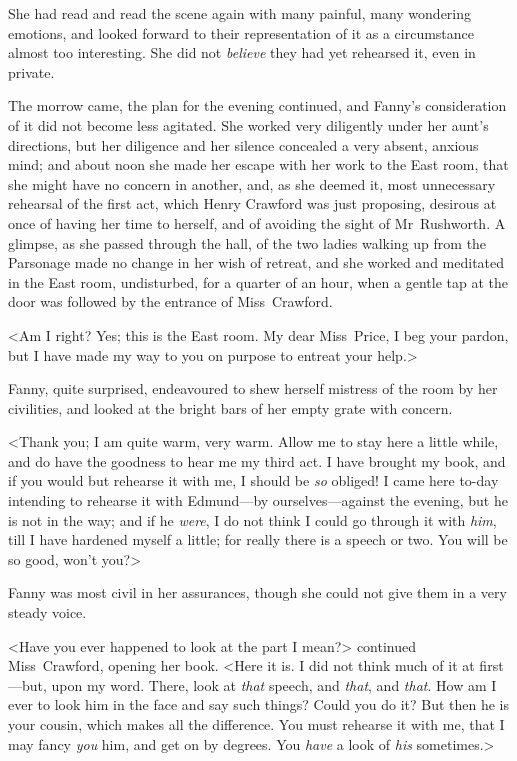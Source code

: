She had read and read the scene again with many painful, many wondering emotions, and looked forward to their representation of it as a circumstance almost too interesting. She did not \textit{believe}  they had yet rehearsed it, even in private.

The morrow came, the plan for the evening continued, and Fanny's consideration of it did not become less agitated. She worked very diligently under her aunt's directions, but her diligence and her silence concealed a very absent, anxious mind; and about noon she made her escape with her work to the East room, that she might have no concern in another, and, as she deemed it, most unnecessary rehearsal of the first act, which Henry Crawford was just proposing, desirous at once of having her time to herself, and of avoiding the sight of Mr~Rushworth. A glimpse, as she passed through the hall, of the two ladies walking up from the Parsonage made no change in her wish of retreat, and she worked and meditated in the East room, undisturbed, for a quarter of an hour, when a gentle tap at the door was followed by the entrance of Miss~Crawford.

<Am I right? Yes; this is the East room. My dear Miss~Price, I beg your pardon, but I have made my way to you on purpose to entreat your help.>

Fanny, quite surprised, endeavoured to shew herself mistress of the room by her civilities, and looked at the bright bars of her empty grate with concern.

<Thank you; I am quite warm, very warm. Allow me to stay here a little while, and do have the goodness to hear me my third act. I have brought my book, and if you would but rehearse it with me, I should be \textit{so}  obliged! I came here to-day intending to rehearse it with Edmund—by ourselves—against the evening, but he is not in the way; and if he \textit{were}, I do not think I could go through it with \textit{him}, till I have hardened myself a little; for really there is a speech or two. You will be so good, won't you?>

Fanny was most civil in her assurances, though she could not give them in a very steady voice.

<Have you ever happened to look at the part I mean?> continued Miss~Crawford, opening her book. <Here it is. I did not think much of it at first—but, upon my word. There, look at \textit{that}  speech, and \textit{that}, and \textit{that}. How am I ever to look him in the face and say such things? Could you do it? But then he is your cousin, which makes all the difference. You must rehearse it with me, that I may fancy \textit{you}  him, and get on by degrees. You \textit{have}  a look of \textit{his}  sometimes.>

